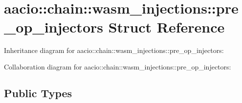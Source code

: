 \hypertarget{structaacio_1_1chain_1_1wasm__injections_1_1pre__op__injectors}{}\section{aacio\+:\+:chain\+:\+:wasm\+\_\+injections\+:\+:pre\+\_\+op\+\_\+injectors Struct Reference}
\label{structaacio_1_1chain_1_1wasm__injections_1_1pre__op__injectors}


Inheritance diagram for aacio\+:\+:chain\+:\+:wasm\+\_\+injections\+:\+:pre\+\_\+op\+\_\+injectors\+:


Collaboration diagram for aacio\+:\+:chain\+:\+:wasm\+\_\+injections\+:\+:pre\+\_\+op\+\_\+injectors\+:
\subsection*{Public Types}

